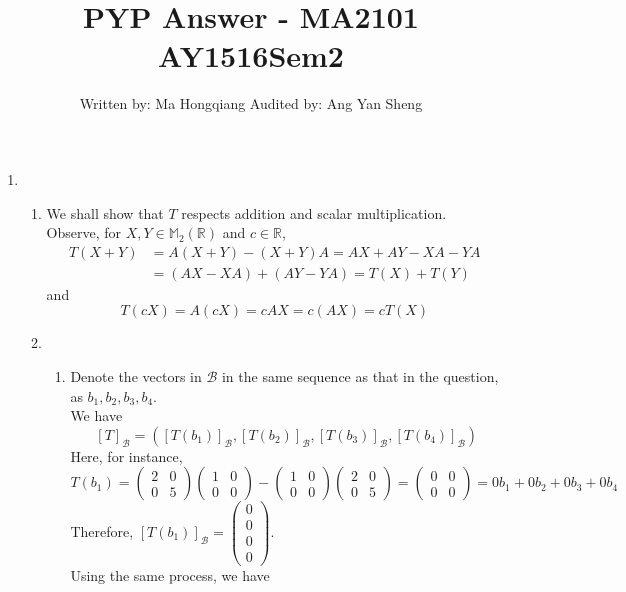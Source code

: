 \documentclass[12pt]{article}
\theoremstyle{definition}
\begin{document}
\title{PYP Answer - MA2101 AY1516Sem2}
\author{Written by: Ma Hongqiang          Audited by: Ang Yan Sheng}
\maketitle
\begin{enumerate}
  \item %
  \begin{enumerate}
    \item We shall show that $T$ respects addition and scalar multiplication.\\Observe, for $X,Y\in \mathbb{M}_2(\mathbb{R})$ and $c\in \mathbb{R}$,
    \begin{align*}
    T(X+Y)&=A(X+Y)-(X+Y)A =AX+AY-XA-YA\\ 
    &= (AX-XA)+(AY-YA)=T(X)+T(Y) 
    \end{align*}
    and
    \[
T(cX)=A(cX)=cAX = c(AX) = cT(X)
    \]
    \item
    \begin{enumerate}\item Denote the vectors in $\mathcal{B}$ in the same sequence as that in the question, as $b_1,b_2,b_3,b_4$. \\We have
    \[
    [T]_\mathcal{B}=([T(b_1)]_\mathcal{B},[T(b_2)]_\mathcal{B},[T(b_3)]_\mathcal{B},[T(b_4)]_\mathcal{B})
    \]
    Here, for instance,
    \[
T(b_1) = \begin{pmatrix}2&0\\0&5\end{pmatrix}\begin{pmatrix}1&0\\0&0\end{pmatrix}-\begin{pmatrix}1&0\\0&0\end{pmatrix}\begin{pmatrix}2&0\\0&5\end{pmatrix}=\begin{pmatrix}0&0\\0&0\end{pmatrix}=0b_1+0b_2+0b_3+0b_4
    \]
    Therefore, $[T(b_1)]_\mathcal{B} = \begin{pmatrix}0\\0\\0\\0\end{pmatrix}$.\\
    Using the same process, we have

\end{enumerate}
\end{enumerate}
\end{enumerate}
\end{document}
